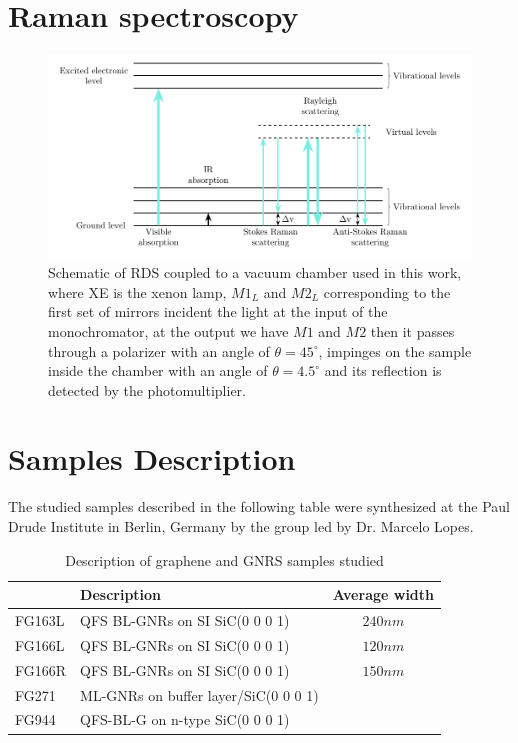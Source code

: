 \section{Raman spectroscopy}

\begin{figure}[H]
	\centering
	\includegraphics[width=0.85\linewidth]{FIGURES/Characterization_techniques/RAMAN-set}
	\caption{Schematic of RDS coupled to a vacuum chamber used in this work, where XE is the xenon lamp, $M1_{L}$ and $M2_{L}$ corresponding to the first set of mirrors incident the light at the input of the monochromator, at the output we have $M1$ and $M2$ then it passes through a polarizer with an angle of $\theta=45^{\circ}$, impinges on the sample inside the chamber with an angle of $\theta=4.5^{\circ}$ and its reflection is detected by the photomultiplier.}
	\label{fig:raman-set}
\end{figure}








\section{Samples Description}
\vspace{-1cm}
The studied samples described in the following table were synthesized at the Paul Drude Institute in Berlin, Germany by the group led by Dr. Marcelo Lopes. 

\begin{table}[H]
	\centering
	\begin{tabular}{lCc}
		\hline
		\hline
		 &  Description &  Average width \\
		\hline
		FG163L &  QFS BL-GNRs on SI SiC(0 0 0 1) & $240 nm$\\
		FG166L &  QFS BL-GNRs on SI SiC(0 0 0 1) & $120 nm$\\
		FG166R &  QFS BL-GNRs on SI SiC(0 0 0 1) & $150 nm$\\
		FG271 &  ML-GNRs on buffer layer/SiC(0 0 0 1) & \\
		FG944&  QFS-BL-G on n-type SiC(0 0 0 1)       &  \\
		\hline
		\hline
	\end{tabular}
	\caption{Description of graphene and GNRS samples studied }
	\label{tab:CH 3 Section 3.1 Photodectors materials}
\end{table}

